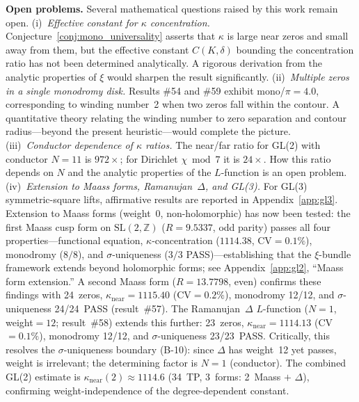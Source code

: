 \documentclass[11pt, a4paper]{article}
\theoremstyle{definition}
\theoremstyle{plain}
\begin{document}
\medskip\noindent
\textbf{Open problems.}\;
Several mathematical questions raised by this work remain open.
(i)~\emph{Effective constant for $\kappa$ concentration.}
Conjecture~\ref{conj:mono_universality} asserts that $\kappa$ is large near zeros and small away from
them, but the effective constant $C(K,\delta)$ bounding the concentration
ratio has not been determined analytically.
A rigorous derivation from the analytic properties of $\xi$ would sharpen
the result significantly.
(ii)~\emph{Multiple zeros in a single monodromy disk.}
Results \#54 and \#59 exhibit mono/$\pi = 4.0$, corresponding to winding
number~2 when two zeros fall within the contour.
A quantitative theory relating the winding number to zero separation and
contour radius---beyond the present heuristic---would complete the picture.
(iii)~\emph{Conductor dependence of $\kappa$ ratios.}
The near/far ratio for GL(2) with conductor $N = 11$ is $972\times$; for
Dirichlet $\chi \bmod 7$ it is $24\times$.
How this ratio depends on $N$ and the analytic properties of the
$L$-function is an open problem.
(iv)~\emph{Extension to Maass forms, Ramanujan~$\Delta$, and GL(3).}
For GL(3) symmetric-square lifts, affirmative results are reported in
Appendix~\ref{app:gl3}.  Extension to Maass forms (weight~0,
non-holomorphic) has now been tested: the first Maass cusp form on
$\mathrm{SL}(2,\mathbb{Z})$ ($R = 9.5337$, odd parity) passes all four
properties---functional equation, $\kappa$-concentration ($1114.38$,
CV${=}0.1\%$), monodromy ($8/8$), and $\sigma$-uniqueness ($3/3$
PASS)---establishing that the $\xi$-bundle framework extends beyond
holomorphic forms; see Appendix~\ref{app:gl2}, ``Maass form extension.''
A second Maass form ($R = 13.7798$, even) confirms these findings
with 24~zeros, $\kappa_{\mathrm{near}} = 1115.40$ (CV${=}0.2\%$), monodromy 12/12,
and $\sigma$-uniqueness 24/24~PASS (result~\#57).
The Ramanujan~$\Delta$ $L$-function ($N{=}1$, weight${=}12$; result~\#58)
extends this further: 23~zeros, $\kappa_{\mathrm{near}} = 1114.13$ (CV${=}0.1\%$),
monodromy 12/12, and $\sigma$-uniqueness 23/23~PASS.
Critically, this resolves the $\sigma$-uniqueness boundary (B-10):
since $\Delta$ has weight~12 yet passes, weight is irrelevant;
the determining factor is $N{=}1$ (conductor).
The combined GL(2) estimate is
$\kappa_{\mathrm{near}}(2) \approx 1114.6$ (34~TP, 3~forms: 2~Maass $+$ $\Delta$),
confirming weight-independence of the degree-dependent constant.
\end{document}

